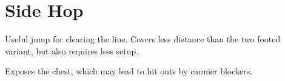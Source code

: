\section{Side Hop}

Useful jump for clearing the line. 
Covers less distance than the two footed variant, but also requires less setup. 

Exposes the chest, which may lead to hit outs by cannier blockers.
